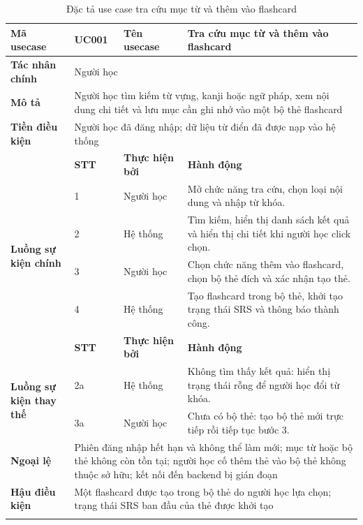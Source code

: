 \documentclass[../DoAn.tex]{subfiles}
\begin{document}
{\footnotesize\singlespacing
\begin{longtable}{|p{2.8cm}|p{1.0cm}|p{2.2cm}|p{7.5cm}|}
\hline
\textbf{Mã usecase} & \textbf{UC001} & \textbf{Tên usecase} & \multicolumn{1}{l|}{Tra cứu mục từ và thêm vào flashcard} \\
\hline
\textbf{Tác nhân chính} & \multicolumn{3}{p{11.1cm}|}{Người học} \\
\hline
\textbf{Mô tả} & \multicolumn{3}{p{11.1cm}|}{Người học tìm kiếm từ vựng, kanji hoặc ngữ pháp, xem nội dung chi tiết và lưu mục cần ghi nhớ vào một bộ thẻ flashcard} \\
\hline
\textbf{Tiền điều kiện} & \multicolumn{3}{p{11.1cm}|}{Người học đã đăng nhập; dữ liệu từ điển đã được nạp vào hệ thống} \\
\hline
 & \textbf{STT} & \textbf{Thực hiện bởi} & \textbf{Hành động} \\
\hline
\multirow{4}{2.8cm}{\textbf{Luồng sự kiện chính}} & 1 & Người học & Mở chức năng tra cứu, chọn loại nội dung và nhập từ khóa. \\
\cline{2-4}
 & 2 & Hệ thống & Tìm kiếm, hiển thị danh sách kết quả và hiển thị chi tiết khi người học click chọn. \\
\cline{2-4}
 & 3 & Người học & Chọn chức năng thêm vào flashcard, chọn bộ thẻ đích và xác nhận tạo thẻ. \\
\cline{2-4}
 & 4 & Hệ thống & Tạo flashcard trong bộ thẻ, khởi tạo trạng thái SRS và thông báo thành công. \\
\hline
 & \textbf{STT} & \textbf{Thực hiện bởi} & \textbf{Hành động} \\
\hline
\multirow{2}{2.8cm}{\textbf{Luồng sự kiện thay thế}} & 2a & Hệ thống & Không tìm thấy kết quả: hiển thị trạng thái rỗng để người học đổi từ khóa. \\
\cline{2-4}
 & 3a & Người học & Chưa có bộ thẻ: tạo bộ thẻ mới trực tiếp rồi tiếp tục bước 3. \\
\hline
\textbf{Ngoại lệ} & \multicolumn{3}{p{11.1cm}|}{Phiên đăng nhập hết hạn và không thể làm mới; mục từ hoặc bộ thẻ không còn tồn tại; người học cố thêm thẻ vào bộ thẻ không thuộc sở hữu; kết nối đến backend bị gián đoạn} \\
\hline
\textbf{Hậu điều kiện} & \multicolumn{3}{p{11.1cm}|}{Một flashcard được tạo trong bộ thẻ do người học lựa chọn; trạng thái SRS ban đầu của thẻ được khởi tạo} \\
\hline
\caption{Đặc tả use case tra cứu mục từ và thêm vào flashcard}
\label{table:UC001}\\
\end{longtable}
}
\end{document}
